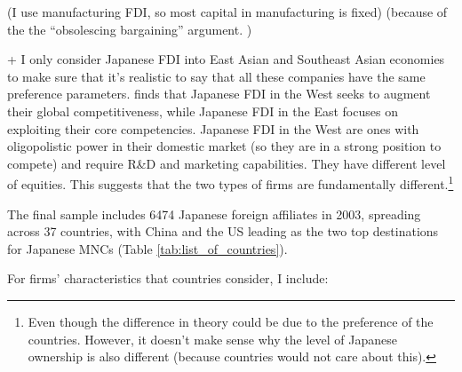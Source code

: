\message{ !name(AnhLe_dissertation.tex)}\documentclass[]{dukedissertation}
\begin{document}
(I use manufacturing FDI, so most capital in manufacturing is fixed) (because of
the the ``obsolescing bargaining'' argument. )

+ I only consider Japanese FDI into East Asian and Southeast Asian economies to
make sure that it's realistic to say that all these companies have the same
preference parameters. \citep{Pak2005} finds that Japanese FDI in the West seeks
to augment their global competitiveness, while Japanese FDI in the East focuses
on exploiting their core competencies. Japanese FDI in the West are ones with
oligopolistic power in their domestic market (so they are in a strong position
to compete) and require R\&D and marketing capabilities. They have different
level of equities. This suggests that the two types of firms are fundamentally
different.\footnote{Even though the difference in theory could be due to the
  preference of the countries. However, it doesn't make sense why the level of
  Japanese ownership is also different (because countries would not care about
  this).}

The final sample includes 6474 Japanese foreign affiliates in 2003, spreading
across 37 countries, with China and the US leading as the two top destinations
for Japanese MNCs (Table \ref{tab:list_of_countries}).

For firms' characteristics that countries consider, I include:
\end{document}
